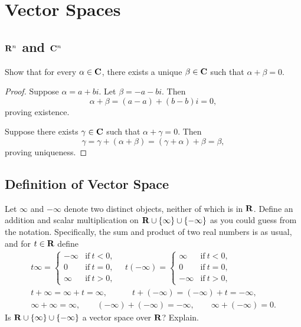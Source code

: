 \chapter{Vector Spaces}


\section{\texorpdfstring{$\mathbf{R}^{n}$}{R\^{}n} and \texorpdfstring{$\mathbf{C}^{n}$}{C\^{}n}}

\begin{exercise}{7}
	Show that for every \( \alpha \in \mathbf{C} \), there exists a unique \( \beta \in \mathbf{C} \)
	such that \( \alpha + \beta = 0 \).
\end{exercise}

\begin{proof}
	Suppose \( \alpha = a + bi \). Let \( \beta = -a - bi \). Then
	\[
		\alpha + \beta = (a - a) + (b - b)i = 0,
	\]
	proving existence.

	Suppose there exists \( \gamma \in \mathbf{C} \) such that \( \alpha + \gamma = 0 \). Then
	\[
		\gamma = \gamma + (\alpha + \beta) = (\gamma + \alpha) + \beta = \beta,
	\]
	proving uniqueness.
\end{proof}



\section{Definition of Vector Space}

\begin{exercise}{6}
	Let \( \infty \) and \( -\infty \) denote two distinct objects, neither of which is in \( \mathbf{R} \). Define an addition and scalar multiplication on \( \mathbf{R} \cup \{\infty\} \cup \{-\infty\} \) as you could guess from the notation. Specifically, the sum and product of two real numbers is as usual, and for
	\( t \in \mathbf{R} \) define
	\begin{gather*}
		t\infty = \begin{cases}
			-\infty & \text{if} \ t < 0, \\
			0       & \text{if} \ t = 0, \\
			\infty  & \text{if} \ t > 0,
		\end{cases} \quad
		t(-\infty) = \begin{cases}
			\infty  & \text{if} \ t < 0, \\
			0       & \text{if} \ t = 0, \\
			-\infty & \text{if} \ t > 0,
		\end{cases} \\
		t + \infty = \infty + t = \infty, \quad\quad\quad t + (-\infty) = (-\infty) + t = -\infty, \\
		\infty + \infty = \infty, \quad\quad (-\infty) + (-\infty) = -\infty, \quad\quad \infty + (-\infty) = 0.
	\end{gather*}
	Is \( \mathbf{R} \cup \{\infty\} \cup \{-\infty\} \) a vector space over \( \mathbf{R} \)? Explain.
\end{exercise}

